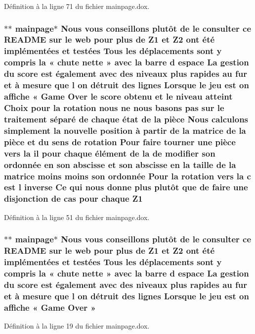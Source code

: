 Définition à la ligne 71 du fichier mainpage.\-dox.

\hypertarget{mainpage_8dox_ac1b4262bdb6c0693bc375775d6cfa421}{
\subsubsection[{Z1}]{\setlength{\rightskip}{0pt plus 5cm}$\ast$$\ast$ mainpage$\ast$ Nous vous conseillons plutô{\bf t} {\bf de} le consulter ce R\-E\-A\-D\-M\-E sur le web pour plus {\bf de} Z1 et Z2 ont é{\bf t}é implémentées et testées Tous les déplacements sont {\bf y} compris la « chute nette » avec la barre d espace La gestion du score est également avec des niveaux plus rapides au fur et à mesure que l on détruit des lignes Lorsque le jeu est on affiche « Game Over le score obtenu et le niveau atteint Choix pour la rotation nous ne nous basons pas sur le traitement {\bf s}éparé {\bf de} chaque état {\bf de} la pièce Nous calculons simplement la nouvelle position à partir {\bf de} la {\bf matrice} {\bf de} la pièce et du {\bf sens} {\bf de} rotation Pour faire tourner une pièce vers la il pour chaque élément {\bf de} la {\bf de} modifier son ordonnée en son abscisse et son abscisse en la taille {\bf de} la {\bf matrice} moins moins son ordonnée Pour la rotation vers la {\bf c} est l inverse Ce qui nous donne plus plutô{\bf t} que {\bf de} faire une disjonction {\bf de} {\bf cas} pour chaque Z1}}\label{mainpage_8dox_ac1b4262bdb6c0693bc375775d6cfa421}


Définition à la ligne 51 du fichier mainpage.\-dox.

\hypertarget{mainpage_8dox_a1df7d96626b3d93110ef592c4d7488c4}{
\subsubsection[{»}]{\setlength{\rightskip}{0pt plus 5cm}$\ast$$\ast$ mainpage$\ast$ Nous vous conseillons plutô{\bf t} {\bf de} le consulter ce R\-E\-A\-D\-M\-E sur le web pour plus {\bf de} {\bf Z1} et Z2 ont é{\bf t}é implémentées et testées Tous les déplacements sont {\bf y} compris la « chute nette » avec la barre d espace La gestion du score est également avec des niveaux plus rapides au fur et à mesure que l on détruit des lignes Lorsque le jeu est on affiche « Game Over »}}\label{mainpage_8dox_a1df7d96626b3d93110ef592c4d7488c4}


Définition à la ligne 19 du fichier mainpage.\-dox.

